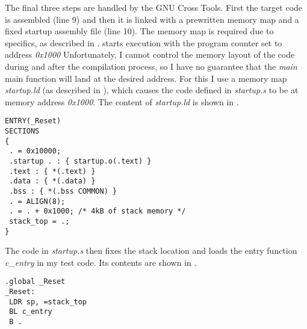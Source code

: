 The final three steps are handled by the GNU Cross Tools.
First the target code is assembled (line 9) and then it is linked with a prewritten memory map and a fixed startup assembly file (line 10).
The memory map is required due to \qemu{} specifics, as described in .
\qemu{} starts execution with the program counter set to address \emph{0x1000} 
Unfortunately, I cannot control the memory layout of the code during and after the compilation process, so I have no guarantee that the \emph{main} main function will land at the desired address.
For this I use a memory map \emph{startup.ld} (as described in \cite{armbare}), which causes the code defined in \emph{startup.s} to be at memory address \emph{0x1000}.
The content of \emph{startup.ld} is shown in .

\begin{lstlisting}[caption=Memory map in \emph{startup.ld}, label=lst:mmap]
ENTRY(_Reset)
SECTIONS
{
 . = 0x10000;
 .startup . : { startup.o(.text) }
 .text : { *(.text) }
 .data : { *(.data) }
 .bss : { *(.bss COMMON) }
 . = ALIGN(8);
 . = . + 0x1000; /* 4kB of stack memory */
 stack_top = .;
}
\end{lstlisting}

The code in \emph{startup.s} then fixes the stack location and loads the entry function \emph{c\_entry} in my test code.
Its contents are shown in .

\begin{lstlisting}[caption=Startup code in \emph{startup.s}, label=lst:startup]
.global _Reset
_Reset:
 LDR sp, =stack_top
 BL c_entry
 B .
\end{lstlisting}
